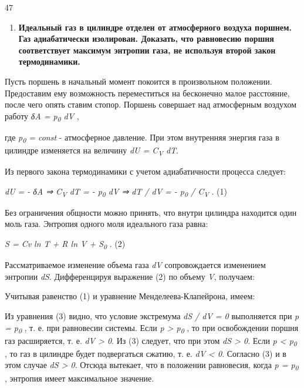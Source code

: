 47


\begin{enumerate}
\def\labelenumi{\arabic{enumi}.}
\setcounter{enumi}{4}
\item
  \textbf{Идеальный газ в цилиндре отделен от атмосферного воздуха
  поршнем. Газ адиабатически изолирован. Доказать, что равновесию поршня
  соответствует максимум энтропии газа, не используя второй закон
  термодинамики.}
\end{enumerate}

\solving{}

Пусть поршень в начальный момент покоится в произвольном положении.
Предоставим ему возможность переместиться на бесконечно малое
расстояние, после чего опять ставим стопор. Поршень совершает над
атмосферным воздухом работу \emph{δA = p\textsubscript{0} dV} ,

где \emph{p\textsubscript{0} = const} - атмосферное давление. При этом
внутренняя энергия газа в цилиндре изменяется на величину \emph{dU =
C\textsubscript{V} dT}.

Из первого закона термодинамики с учетом адиабатичности процесса
следует:

\emph{dU = - δA ⇒ C\textsubscript{V} dT = - p\textsubscript{0} dV ⇒ dT /
dV = - p\textsubscript{0} / C\textsubscript{V}} . (1)

Без ограничения общности можно принять, что внутри цилиндра находится
один моль газа. Энтропия одного моля идеального газа равна:

\emph{S = Cv ln T + R ln V + S\textsubscript{0}} . (2)

Рассматриваемое изменение объема газа \emph{dV} сопровождается
изменением энтропии \emph{dS}. Дифференцируя выражение (2) по объему
\emph{V}, получаем:


Учитывая равенство (1) и уравнение Менделеева-Клапейрона, имеем:


Из уравнения (3) видно, что условие экстремума \emph{dS / dV = 0}
выполняется при \emph{p = p\textsubscript{0}} , т. е. при равновесии
системы. Если \emph{p \textgreater{} p\textsubscript{0}} , то при
освобождении поршня газ расширяется, т. е. \emph{dV \textgreater{} 0}.
Из (3) следует, что при этом \emph{dS \textgreater{} 0}. Если \emph{p
\textless{} p\textsubscript{0}} , то газ в цилиндре будет подвергаться
сжатию, т. е. \emph{dV \textless{} 0}. Согласно (3) и в этом случае
\emph{dS \textgreater{} 0}. Отсюда вытекает, что в положении равновесия,
когда \emph{p = p\textsubscript{0}} , энтропия имеет максимальное
значение.

